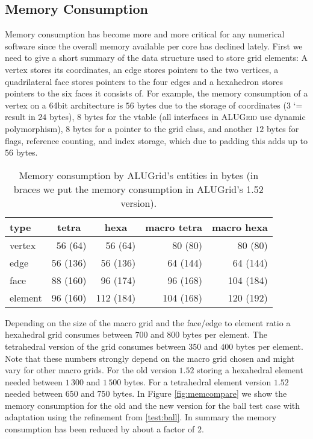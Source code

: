 \documentclass[10pt,notitlepage,a4paper]{article}
\makeatletter
\newcommand{\alugrid}{\textsc{ALUGrid}\xspace}
\newcommand{\code}[1]{ \lstinline[basicstyle=\small\sffamily]{#1} }
\renewcommand\lstinline[1][]{\leavevmode\bgroup \def\lst@boxpos{b}\lsthk@PreSet\lstset{flexiblecolumns,#1}\lsthk@TextStyle
          \ifnum\iffalse{\fi`}=\z@\fi
          \@ifnextchar\bgroup{\ifnum`{=\z@}\fi \afterassignment\lst@InlineG \let\@let@token}{\ifnum`{=\z@}\fi\lstinline@}}
\newcommand{\tbl}[2]{\begin{center}\caption{#1}{#2}\end{center}}
\makeatother
\begin{document}
\subsection{Memory Consumption}
\label{sec:memory}
Memory consumption has become more and more critical for any numerical software 
since the overall memory available per core has declined lately. 
First we need to give a short summary of the data structure used to store
grid elements:
A vertex stores its coordinates, an edge stores pointers
to the two vertices, a quadrilateral face stores pointers to the four edges and a hexahedron stores
pointers to the six faces it consists of. For example, the memory consumption of a vertex on a
64bit architecture is $56$ bytes due to the storage of coordinates ($3$ \code{double} result in $24$ bytes), 
$8$ bytes for the vtable (all interfaces in \alugrid use dynamic polymorphism),
$8$ bytes for a pointer to the grid class, 
and another $12$ bytes for flags, reference counting, and index storage, which due to padding this adds up to
$56$ bytes.

\begin{table}[ht]{}
\renewcommand{\arraystretch}{1.5}
\tbl{Memory consumption by ALUGrid's entities in bytes (in braces we put the memory
consumption in  ALUGrid's 1.52 version).}{\begin{tabular}{l|rr|rr}
  type         &   \multicolumn{1}{c}{tetra}  & \multicolumn{1}{c|}{ hexa} & \multicolumn{1}{c}{  macro tetra} & \multicolumn{1}{c}{ macro hexa} \\ \hline \hline 
  vertex       &   56 \phantom{5}(64)  &  56 \phantom{5}(64)  &   80 \phantom{5}(80)   &  80 \phantom{5}(80)  \\
  edge         &   56 (136) &  56  (136) &   64  (144)  &  64  (144) \\ 
  face         &   88 (160) &  96  (174) &   96  (168)  &  104 (184) \\ 
  element      &   96 (160) &  112 (184) &   104 (168)  &  120 (192) \\  
\end{tabular}}
\end{table}

Depending on the size of the macro grid and the face/edge to element ratio a hexahedral
grid consumes between $700$ and $800$ bytes per element. The tetrahedral version of the grid 
consumes between $350$ and $400$ bytes per element. Note that these numbers strongly
depend on the macro grid chosen and might vary for other macro grids. 
For the old version $1.52$ storing a hexahedral element needed between $1\,300$ and
$1\,500$ bytes. For a tetrahedral element version $1.52$ needed between $650$ and $750$ bytes.  
In Figure \ref{fig:memcompare} we show the memory consumption for the old and the new
version for the ball test case with adaptation using the refinement from \eqref{test:ball}. 
In summary the memory consumption has been reduced by about a factor of $2$.
\end{document}
